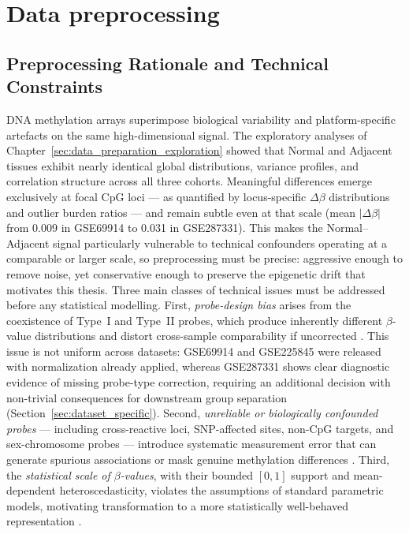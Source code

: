 \chapter{Data preprocessing}
\label{chap:data_preprocessing}


\section{Preprocessing Rationale and Technical Constraints}
\label{sec:preprocessing_rationale}

DNA methylation arrays superimpose biological variability and platform-specific
artefacts on the same high-dimensional signal. The exploratory analyses of
Chapter~\ref{sec:data_preparation_exploration} showed that Normal and Adjacent
tissues exhibit nearly identical global distributions, variance profiles, and
correlation structure across all three cohorts. Meaningful differences emerge
exclusively at focal CpG loci — as quantified by locus-specific $\Delta\beta$
distributions and outlier burden ratios — and remain subtle even at that scale
(mean $|\Delta\beta|$ from 0.009 in GSE69914 to 0.031 in GSE287331). This makes
the Normal--Adjacent signal particularly vulnerable to technical confounders
operating at a comparable or larger scale, so preprocessing must be precise:
aggressive enough to remove noise, yet conservative enough to preserve the
epigenetic drift that motivates this thesis.
Three main classes of technical issues must be addressed before any statistical
modelling. First, \emph{probe-design bias} arises from the coexistence of
Type~I and Type~II probes, which produce inherently different $\beta$-value
distributions and distort cross-sample comparability if uncorrected
\cite{Triche2013Noob, Fortin2017}. This issue is not uniform across datasets:
GSE69914 and GSE225845 were released with normalization already applied, whereas
GSE287331 shows clear diagnostic evidence of missing probe-type correction,
requiring an additional decision with non-trivial consequences for downstream
group separation (Section~\ref{sec:dataset_specific}). Second,
\emph{unreliable or biologically confounded probes} — including cross-reactive
loci, SNP-affected sites, non-CpG targets, and sex-chromosome probes — introduce
systematic measurement error that can generate spurious associations or mask
genuine methylation differences \cite{WilhelmBenartzi2013, Xu2021}. Third, the
\emph{statistical scale of $\beta$-values}, with their bounded $[0,1]$ support
and mean-dependent heteroscedasticity, violates the assumptions of standard
parametric models, motivating transformation to a more statistically
well-behaved representation \cite{Triche2013Noob}.

